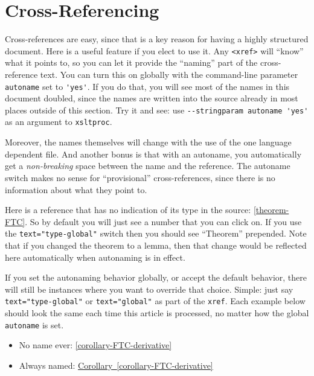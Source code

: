\documentclass[10pt,]{article}
\theoremstyle{plain}
\theoremstyle{definition}
\theoremstyle{definition}
\theoremstyle{definition}
\theoremstyle{definition}
\theoremstyle{definition}
\theoremstyle{definition}
\numberwithin{equation}{section}
\begin{document}
\section[{Cross-Referencing}]{Cross-Referencing}\label{section-cross-referencing}
\hypertarget{p-519}{}%
Cross-references are easy, since that is a key reason for having a highly structured document.  Here is a useful feature if you elect to use it.  Any \lstinline?<xref>? will ``know'' what it points to, so you can let it provide the ``naming'' part of the cross-reference text.  You can turn this on globally with the command-line parameter \lstinline?autoname? set to \lstinline?'yes'?.  If you do that, you will see most of the names in this document doubled, since the names are written into the source already in most places outside of this section.  Try it and see: use \lstinline?--stringparam autoname 'yes'? as an argument to \lstinline?xsltproc?.%
\par
\hypertarget{p-520}{}%
Moreover, the names themselves will change with the use of the one language dependent file.  And another bonus is that with an autoname, you automatically get a \emph{non-breaking} space between the name and the reference.  The autoname switch makes no sense for ``provisional'' cross-references, since there is no information about what they point to.%
\par
\hypertarget{p-521}{}%
Here is a reference that has no indication of its type in the source:  \hyperref[theorem-FTC]{\ref{theorem-FTC}}.  So by default you will just see a number that you can click on.  If you use the \lstinline?text="type-global"? switch then you should see ``Theorem'' prepended.  Note that if you changed the theorem to a lemma, then that change would be reflected here automatically when autonaming is in effect.%
\par
\hypertarget{p-522}{}%
If you set the autonaming behavior globally, or accept the default behavior, there will still be instances where you want to override that choice.  Simple: just say \lstinline?text="type-global"? or \lstinline?text="global"? as part of the \lstinline?xref?.  Each example below should look the same each time this article is processed, no matter how the global \lstinline?autoname? is set.\leavevmode%
\begin{itemize}[label=\textbullet]
\item{}\hypertarget{p-523}{}%
No name ever: \hyperref[corollary-FTC-derivative]{\ref{corollary-FTC-derivative}}%
\item{}\hypertarget{p-524}{}%
Always named: \hyperref[corollary-FTC-derivative]{Corollary~\ref{corollary-FTC-derivative}}%
\end{itemize}
\end{document}
